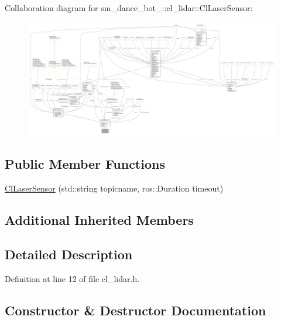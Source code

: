 Collaboration diagram for sm\+\_\+dance\+\_\+bot\+\_\+:\+:cl\+\_\+lidar\+:\+:Cl\+Laser\+Sensor\+:
\nopagebreak
\begin{figure}[H]
\begin{center}
\leavevmode
\includegraphics[width=350pt]{classsm__dance__bot__2_1_1cl__lidar_1_1ClLaserSensor__coll__graph}
\end{center}
\end{figure}
\subsection*{Public Member Functions}
\begin{DoxyCompactItemize}
\item 
\hyperlink{classsm__dance__bot__2_1_1cl__lidar_1_1ClLaserSensor_a548355dc7e35671bf138a4d530306f53}{Cl\+Laser\+Sensor} (std\+::string topicname, ros\+::\+Duration timeout)
\end{DoxyCompactItemize}
\subsection*{Additional Inherited Members}


\subsection{Detailed Description}


Definition at line 12 of file cl\+\_\+lidar.\+h.



\subsection{Constructor \& Destructor Documentation}

